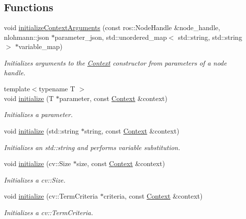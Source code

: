 \subsection*{Functions}
\begin{DoxyCompactItemize}
\item 
void \hyperlink{namespacestereo__ugv_a68c69a3de2a5351d41ce848792c213f4}{initialize\+Context\+Arguments} (const ros\+::\+Node\+Handle \&node\+\_\+handle, nlohmann\+::json $\ast$parameter\+\_\+json, std\+::unordered\+\_\+map$<$ std\+::string, std\+::string $>$ $\ast$variable\+\_\+map)
\begin{DoxyCompactList}\small\item\em Initializes arguments to the \hyperlink{classstereo__ugv_1_1Context}{Context} constructor from parameters of a node handle. \end{DoxyCompactList}\item 
{\footnotesize template$<$typename T $>$ }\\void \hyperlink{namespacestereo__ugv_a6971cc11001fdf589a71f6fb3099c65b}{initialize} (T $\ast$parameter, const \hyperlink{classstereo__ugv_1_1Context}{Context} \&context)
\begin{DoxyCompactList}\small\item\em Initializes a parameter. \end{DoxyCompactList}\item 
void \hyperlink{namespacestereo__ugv_aaa158ec1ee9178414843adbbb91a394b}{initialize} (std\+::string $\ast$string, const \hyperlink{classstereo__ugv_1_1Context}{Context} \&context)
\begin{DoxyCompactList}\small\item\em Initializes an std\+::string and performs variable substitution. \end{DoxyCompactList}\item 
void \hyperlink{namespacestereo__ugv_adab204dc6f43824bcda4cd5e172d2812}{initialize} (cv\+::\+Size $\ast$size, const \hyperlink{classstereo__ugv_1_1Context}{Context} \&context)
\begin{DoxyCompactList}\small\item\em Initializes a cv\+::\+Size. \end{DoxyCompactList}\item 
void \hyperlink{namespacestereo__ugv_a0a98148c84d1f085ac51c2f2fb7c8e7a}{initialize} (cv\+::\+Term\+Criteria $\ast$criteria, const \hyperlink{classstereo__ugv_1_1Context}{Context} \&context)
\begin{DoxyCompactList}\small\item\em Initializes a cv\+::\+Term\+Criteria. \end{DoxyCompactList}\item 

\end{DoxyCompactItemize}
